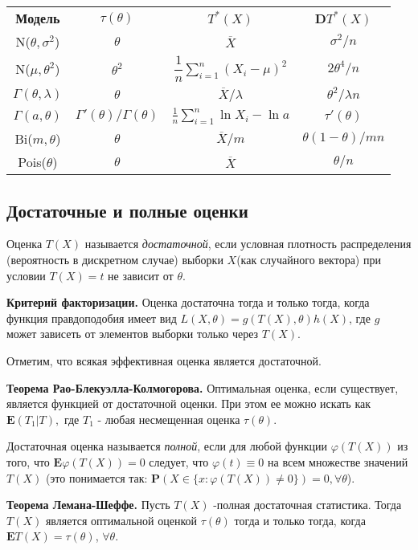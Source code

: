 \documentclass[a4paper,12pt]{scrartcl}
\newcommand{\E}{\mathbf{E}}
\newcommand{\D}{\mathbf{D}}
\newcommand{\Prb}{\mathbf{P}}
\begin{document}
\begin{tabular}{|c|c|c|c|}
{\bfseries Модель} & \bfseries{$\tau(\theta)$} &\bfseries{$T^*(X)$} & \bfseries{$\D T^*(X)$}\\
N($\theta,\sigma^2$)& $\theta$ & $\overline{X}$ & $\sigma^2/n$\\
N($\mu,\theta^2$)& $\theta^2$ & $\dfrac{1}{n}\sum\limits_{i=1}^{n}(X_i-\mu)^2$ & $ 2\theta^4/n$\\
$\Gamma(\theta,\lambda)$ & $\theta$ & $\overline{X}/\lambda$ & $\theta^2/\lambda n$\\
$\Gamma(a,\theta)$ & $\Gamma'(\theta)/\Gamma(\theta) $ & $\frac{1}{n}\sum\limits_{i=1}^{n}\ln X_i - \ln a$ & $\tau'(\theta)$\\
Bi($m,\theta$)& $\theta$ & $\overline{X}/m$ &  $\theta(1-\theta)/mn $\\
Pois($\theta$)& $\theta$ & $\overline{X}$ & $\theta/n$\\
\end{tabular}
\subsection{Достаточные и полные оценки}
Оценка $T(X)$ называется \emph{достаточной}, если  условная плотность распределения (вероятность в дискретном случае) выборки $X$(как случайного вектора) при условии $T(X) = t$ не зависит от $\theta$.

{\bfseries Критерий факторизации.} Оценка достаточна тогда и только тогда, когда функция правдоподобия имеет вид $L(X,\theta) = g(T(X),\theta)h(X)$, где $g$ может зависеть от элементов выборки только через $T(X)$.

Отметим, что всякая эффективная оценка является достаточной.

{\bfseries Теорема Рао-Блекуэлла-Колмогорова.} Оптимальная оценка, если существует, является функцией от достаточной оценки. При этом ее можно искать как $\E (T_1 | T),$ где $T_1$ - любая несмещенная оценка $\tau(\theta).$

Достаточная оценка называется \emph{полной}, если для любой функции $\varphi(T(X))$ из того, что $\E \varphi(T(X)) = 0$ следует, что $\varphi(t) \equiv 0$ на всем множестве значений $T(X)$ (это понимается так: $\Prb (X \in \{x: \varphi(T(X)) \neq 0 \})=0, \forall \theta$).

{\bfseries Теорема Лемана-Шеффе.} Пусть $T(X)$ -полная достаточная статистика. Тогда $T(X)$ является оптимальной оценкой $\tau(\theta)$ тогда и только тогда, когда $\E T(X) = \tau(\theta)$, $\forall \theta$.
\end{document}
